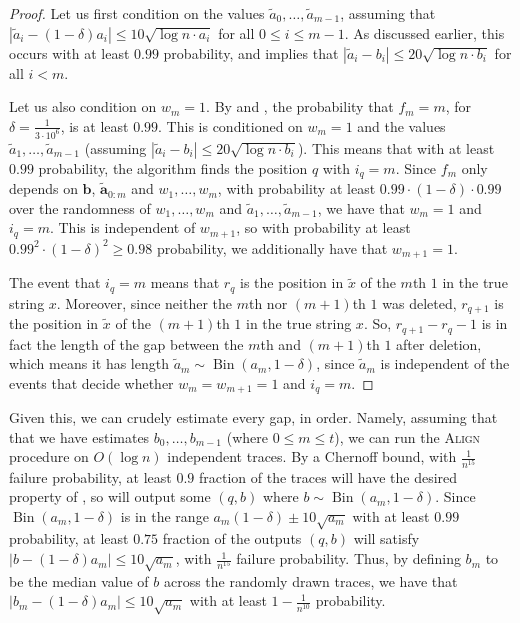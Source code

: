 \documentclass[12pt]{article}
\theoremstyle{definition}
\theoremstyle{remark}
\DeclareMathOperator{\Bin}{Bin}
\newcommand{\ba}{\mathbf a}
\newcommand{\bb}{\mathbf b}
\begin{document}
\begin{proof}
    Let us first condition on the values $\tilde{a}_0, \dots, \tilde{a}_{m-1}$, assuming that $|\tilde{a}_i-(1-\delta)a_i| \le 10 \sqrt{\log n \cdot a_i}$ for all $0 \le i \le m-1$. As discussed earlier, this occurs with at least $0.99$ probability, and implies that $|\tilde{a}_i-b_i| \le 20 \sqrt{\log n \cdot b_i}$ for all $i < m$.

    Let us also condition on $w_m = 1$. By  and , the probability that $f_m = m$, for $\delta = \frac{1}{3 \cdot 10^6}$, is at least $0.99$. This is conditioned on $w_m = 1$ and the values $\tilde{a}_1, \dots, \tilde{a}_{m-1}$ (assuming $|\tilde{a}_i-b_i| \le 20 \sqrt{\log n \cdot b_i}$). This means that with at least $0.99$ probability, the algorithm finds the position $q$ with $i_{q} = m$.
    Since $f_m$ only depends on $\bb$, $\tilde{\ba}_{0:m}$ and $w_1, \dots, w_m$, with probability at least $0.99 \cdot (1-\delta) \cdot 0.99$ over the randomness of $w_1, \dots, w_m$ and $\tilde{a}_1, \dots, \tilde{a}_{m-1}$, we have that $w_m = 1$ and $i_{q} = m$. This is independent of $w_{m+1}$, so with probability at least $0.99^2 \cdot (1-\delta)^2 \ge 0.98$ probability, we additionally have that $w_{m+1} = 1$.
    
    The event that $i_q = m$ means that $r_q$ is the position in $\tilde{x}$ of the $m$th $1$ in the true string $x$. Moreover, since neither the $m$th nor $(m+1)$th $1$ was deleted, $r_{q+1}$ is the position in $\tilde{x}$ of the $(m+1)$th $1$ in the true string $x$. So, $r_{q+1}-r_q-1$ is in fact the length of the gap between the $m$th and $(m+1)$th $1$ after deletion, which means it has length $\tilde{a}_m \sim \Bin(a_m, 1-\delta)$, since $\tilde{a}_m$ is independent of the events that decide whether $w_m = w_{m+1} = 1$ and $i_q = m$.
\end{proof}

Given this, we can crudely estimate every gap, in order. Namely, assuming that that we have estimates $b_0, \dots, b_{m-1}$ (where $0 \le m \le t$), we can run the \textsc{Align} procedure on $O(\log n)$ independent traces. By a Chernoff bound, with $\frac{1}{n^{15}}$ failure probability, at least $0.9$ fraction of the traces will have the desired property of , so will output some $(q, b)$ where $b \sim \Bin(a_m, 1-\delta)$. Since $\Bin(a_m, 1-\delta)$ is in the range $a_m(1-\delta) \pm 10 \sqrt{a_m}$ with at least $0.99$ probability, at least $0.75$ fraction of the outputs $(q, b)$ will satisfy $|b - (1-\delta) a_m| \le 10 \sqrt{a_m}$, with $\frac{1}{n^{15}}$ failure probability. Thus, by defining $b_m$ to be the median value of $b$ across the randomly drawn traces, we have that $|b_m-(1-\delta) a_m| \le 10 \sqrt{a_m}$ with at least $1 - \frac{1}{n^{10}}$ probability.
\end{document}
